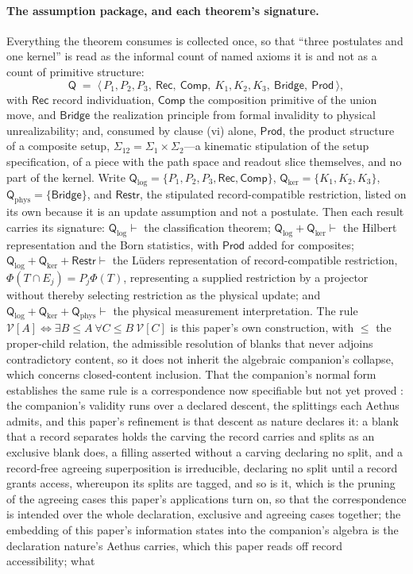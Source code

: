 \paragraph{The assumption package, and each theorem's signature.} Everything the theorem consumes is collected once, so that ``three postulates and one kernel'' is read as the informal count of named axioms it is and not as a count of primitive structure:
\[ \mathsf{Q} \;=\; \langle\, P_1, P_2, P_3,\ \mathsf{Rec},\ \mathsf{Comp},\ K_1, K_2, K_3,\ \mathsf{Bridge},\ \mathsf{Prod} \,\rangle, \]
with $\mathsf{Rec}$ record individuation, $\mathsf{Comp}$ the composition primitive of the union move, and $\mathsf{Bridge}$ the realization principle from formal invalidity to physical unrealizability; and, consumed by clause (vi) alone, $\mathsf{Prod}$, the product structure of a composite setup, $\Sigma_{12} = \Sigma_1 \times \Sigma_2$---a kinematic stipulation of the setup specification, of a piece with the path space and readout slice themselves, and no part of the kernel. Write $\mathsf{Q}_{\log} = \{P_1, P_2, P_3, \mathsf{Rec}, \mathsf{Comp}\}$, $\mathsf{Q}_{\mathrm{ker}} = \{K_1, K_2, K_3\}$, $\mathsf{Q}_{\mathrm{phys}} = \{\mathsf{Bridge}\}$, and $\mathsf{Restr}$, the stipulated record-compatible restriction, listed on its own because it is an update assumption and not a postulate. Then each result carries its signature: $\mathsf{Q}_{\log} \vdash$ the classification theorem; $\mathsf{Q}_{\log} + \mathsf{Q}_{\mathrm{ker}} \vdash$ the Hilbert representation and the Born statistics, with $\mathsf{Prod}$ added for composites; $\mathsf{Q}_{\log} + \mathsf{Q}_{\mathrm{ker}} + \mathsf{Restr} \vdash$ the L\"{u}ders representation of record-compatible restriction, $\Phi(T \cap E_j) = P_j \Phi(T)$, representing a supplied restriction by a projector without thereby selecting restriction as the physical update; and $\mathsf{Q}_{\log} + \mathsf{Q}_{\mathrm{ker}} + \mathsf{Q}_{\mathrm{phys}} \vdash$ the physical measurement interpretation. The rule $\mathcal{V}[A] \iff \exists B \le A\ \forall C \le B\ \mathcal{V}[C]$ is this paper's own construction, with $\le$ the proper-child relation, the admissible resolution of blanks that never adjoins contradictory content, so it does not inherit the algebraic companion's collapse, which concerns closed-content inclusion. That the companion's normal form establishes the same rule is a correspondence now specifiable but not yet proved \cite{AethusTree}: the companion's validity runs over a declared descent, the splittings each Aethus admits, and this paper's refinement is that descent as nature declares it: a blank that a record separates holds the carving the record carries and splits as an exclusive blank does, a filling asserted without a carving declaring no split, and a record-free agreeing superposition is irreducible, declaring no split until a record grants access, whereupon its splits are tagged, and so is it, which is the pruning of the agreeing cases this paper's applications turn on, so that the correspondence is intended over the whole declaration, exclusive and agreeing cases together; the embedding of this paper's information states into the companion's algebra is the declaration nature's Aethus carries, which this paper reads off record accessibility; what 